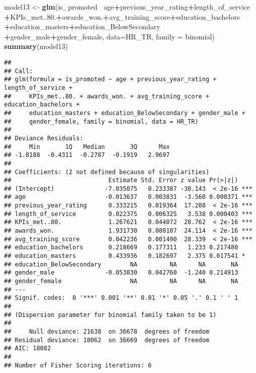 \documentclass[
]{article}
\newenvironment{Shaded}{\begin{snugshade}}{\end{snugshade}}
\newcommand{\DataTypeTok}[1]{\textcolor[rgb]{0.13,0.29,0.53}{#1}}
\newcommand{\FloatTok}[1]{\textcolor[rgb]{0.00,0.00,0.81}{#1}}
\newcommand{\KeywordTok}[1]{\textcolor[rgb]{0.13,0.29,0.53}{\textbf{#1}}}
\newcommand{\NormalTok}[1]{#1}
\newcommand{\OperatorTok}[1]{\textcolor[rgb]{0.81,0.36,0.00}{\textbf{#1}}}
\newcommand{\StringTok}[1]{\textcolor[rgb]{0.31,0.60,0.02}{#1}}
\begin{document}
\begin{Shaded}
\begin{Highlighting}[]
\NormalTok{model13 <-}\StringTok{ }\KeywordTok{glm}\NormalTok{(is_promoted }\OperatorTok{~}\NormalTok{age}\OperatorTok{+}\NormalTok{previous_year_rating}\OperatorTok{+}\NormalTok{length_of_service}
               \OperatorTok{+}\NormalTok{KPIs_met..}\FloatTok{80.}\OperatorTok{+}\NormalTok{awards_won.}\OperatorTok{+}\NormalTok{avg_training_score}\OperatorTok{+}\NormalTok{education_bachelors}
               \OperatorTok{+}\NormalTok{education_masters}\OperatorTok{+}\NormalTok{education_BelowSecondary}
               \OperatorTok{+}\NormalTok{gender_male}\OperatorTok{+}\NormalTok{gender_female, }
               \DataTypeTok{data=}\NormalTok{HR_TR, }\DataTypeTok{family =}\NormalTok{ binomial)}
\KeywordTok{summary}\NormalTok{(model13)}
\end{Highlighting}
\end{Shaded}

\begin{verbatim}
## 
## Call:
## glm(formula = is_promoted ~ age + previous_year_rating + length_of_service + 
##     KPIs_met..80. + awards_won. + avg_training_score + education_bachelors + 
##     education_masters + education_BelowSecondary + gender_male + 
##     gender_female, family = binomial, data = HR_TR)
## 
## Deviance Residuals: 
##     Min       1Q   Median       3Q      Max  
## -1.8188  -0.4311  -0.2787  -0.1919   2.9697  
## 
## Coefficients: (2 not defined because of singularities)
##                           Estimate Std. Error z value Pr(>|z|)    
## (Intercept)              -7.035075   0.233387 -30.143  < 2e-16 ***
## age                      -0.013637   0.003831  -3.560 0.000371 ***
## previous_year_rating      0.333215   0.019364  17.208  < 2e-16 ***
## length_of_service         0.022375   0.006325   3.538 0.000403 ***
## KPIs_met..80.             1.267621   0.044072  28.762  < 2e-16 ***
## awards_won.               1.931730   0.080107  24.114  < 2e-16 ***
## avg_training_score        0.042236   0.001490  28.339  < 2e-16 ***
## education_bachelors       0.218669   0.177311   1.233 0.217480    
## education_masters         0.433936   0.182697   2.375 0.017541 *  
## education_BelowSecondary        NA         NA      NA       NA    
## gender_male              -0.053030   0.042760  -1.240 0.214913    
## gender_female                   NA         NA      NA       NA    
## ---
## Signif. codes:  0 '***' 0.001 '**' 0.01 '*' 0.05 '.' 0.1 ' ' 1
## 
## (Dispersion parameter for binomial family taken to be 1)
## 
##     Null deviance: 21638  on 36678  degrees of freedom
## Residual deviance: 18062  on 36669  degrees of freedom
## AIC: 18082
## 
## Number of Fisher Scoring iterations: 6
\end{verbatim}
\end{document}
